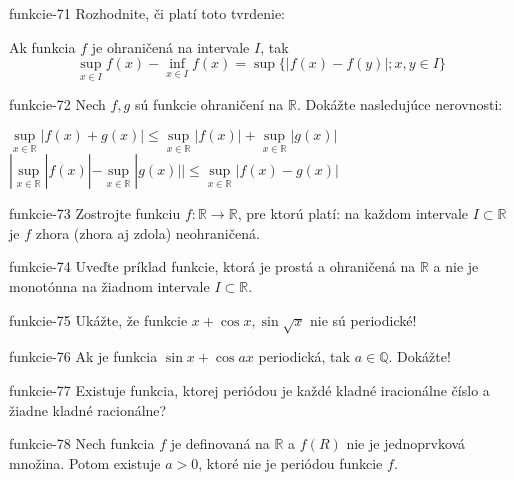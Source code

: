 \begin{defproblem}{funkcie-71}
Rozhodnite, či platí toto tvrdenie:

Ak funkcia $f$ je ohraničená na intervale $I$, tak
\[
  \sup_{x\in I}f(x)-\inf_{x\in I}f(x)=\sup \{|f(x)-f(y)|;x,y\in I\}
\]
\end{defproblem}

\begin{defproblem}{funkcie-72}
Nech $f,g$ sú funkcie ohraničení na $\mathbb{R}$. Dokážte nasledujúce
nerovnosti:
\begin{tasks}
\task
  $
    \sup\limits_{x\in\mathbb{R}}|f(x)+g(x)|
    \leq
      \sup\limits_{x\in\mathbb{R}}|f(x)|
      +
      \sup\limits_{x\in\mathbb{R}}|g(x)|
  $
\task
  $
    |\sup\limits_{x\in\mathbb{R}}|f(x)|
    -
    \sup\limits_{x\in\mathbb{R}}|g(x)||
    \leq
    \sup\limits_{x\in\mathbb{R}}|f(x)-g(x)|
  $
\end{tasks}
\end{defproblem}

\begin{defproblem}{funkcie-73}
Zostrojte funkciu $f:\mathbb{R}\rightarrow\mathbb{R}$, pre ktorú platí: na
každom intervale $I\subset\mathbb{R}$ je $f$ zhora (zhora aj zdola)
neohraničená.
\end{defproblem}

\begin{defproblem}{funkcie-74}
Uveďte príklad funkcie, ktorá je prostá a ohraničená na $\mathbb{R}$ a nie je
monotónna na žiadnom intervale $I\subset\mathbb{R}$.
\end{defproblem}

\begin{defproblem}{funkcie-75}
Ukážte, že funkcie $x+\cos x,\sin\sqrt{x}$ nie sú periodické!
\end{defproblem}

\begin{defproblem}{funkcie-76}
Ak je funkcia $\sin x +\cos ax$ periodická, tak $a\in\mathbb{Q}$. Dokážte!
\end{defproblem}

\begin{defproblem}{funkcie-77}
Existuje funkcia, ktorej periódou je každé kladné iracionálne číslo a žiadne
kladné racionálne?
\end{defproblem}

\begin{defproblem}{funkcie-78}
Nech funkcia $f$ je definovaná na $\mathbb{R}$ a $f(R)$ nie je jednoprvková
množina. Potom existuje $a>0$, ktoré nie je periódou funkcie $f$.
\end{defproblem}

